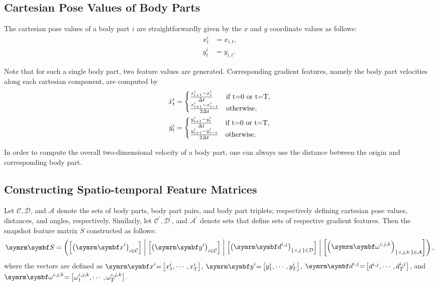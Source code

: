 \subsection{Cartesian Pose Values of Body Parts}
The cartesian pose values of a body part $i$ are straightforwardly given by the $x$ and $y$ coordinate values as follows:
\begin{equation}
	\begin{aligned}
		x^{i}_t & = x_{i,t}, \\
		y^{i}_t & = y_{i,t}.
	\end{aligned}
\end{equation}

Note that for such a single body part, two feature values are generated.
Corresponding gradient features, namely the body part velocities along each cartesian component, are computed by
\begin{equation}
	\begin{aligned}
		\dot{x}^{i}_t & = \begin{cases} \frac{x^{i}_{t+1} - x^{i}_{t}}{\Delta t} & \textnormal{if } $t=0$ \textnormal{ or } $t=T$, \\ \frac{x^{i}_{t+1} - x^{i}_{t-1}}{2\Delta t} & \textnormal{otherwise}, \end{cases} \\
		\dot{y}^{i}_t & = \begin{cases} \frac{y^{i}_{t+1} - y^{i}_{t}}{\Delta t} & \textnormal{if } $t=0$ \textnormal{ or } $t=T$, \\ \frac{y^{i}_{t+1} - y^{i}_{t-1}}{2\Delta t} & \textnormal{otherwise}. \end{cases}
	\end{aligned}
\end{equation}

In order to compute the overall two-dimensional velocity of a body part, one can always use the distance between the origin and corresponding body part.

\subsection{Constructing Spatio-temporal Feature Matrices}
Let $\mathcal{C}, \mathcal{D}$, and $\mathcal{A}$ denote the sets of body parts, body part pairs, and body part triplets; respectively defining cartesian pose values, distances, and angles, respectively.
Similarly, let $\mathcal{C}^{\prime}, \mathcal{D}^{\prime}$, and $\mathcal{A}^{\prime}$ denote sets that define sets of respective gradient features.
Then the snapshot feature matrix $S$ constructed as follows:
\begin{equation}
	\V{S} = \rbr{\qmatrix{\rbr{\V{x}^i}_{i \in \mathcal{C}}} \concat \qmatrix{\rbr{\V{y}^i}_{i \in \mathcal{C}}} \concat \qmatrix{\rbr{\V{d}^{i,j}}_{\set{i,j} \in \mathcal{D}}} \concat \qmatrix{\rbr{\V{\omega}^{i,j,k}}_{\set{i,j,k} \in \mathcal{A}}}},
\end{equation}
where the vectors are defined as $\V{x}^{i}{=}\qmatrix{x^{i}_1, \cdots, x^{i}_T}$, $\V{y}^{i}{=}\qmatrix{y^{i}_1, \cdots, y^{i}_T}$,   $\V{d}^{i,j}{=}\qmatrix{d^{i,j}, \cdots, d^{i,j}_T}$, and $\V{\omega}^{i,j,k}{=}\qmatrix{\omega_1^{i,j,k}, \cdots, \omega^{i,j,k}_T}$.

